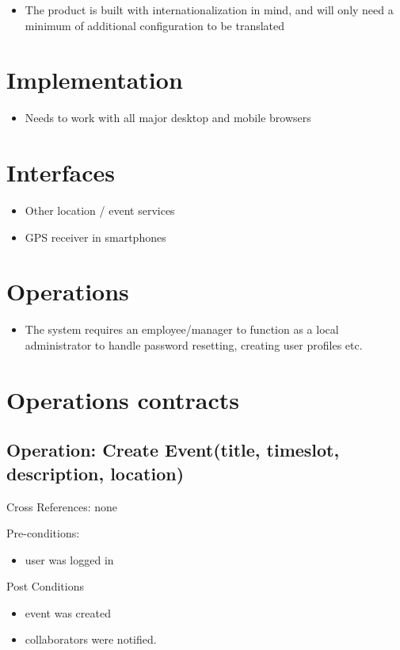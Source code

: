 \documentclass[10pt]{article}
\begin{document}
\begin{itemize}
\item The product is built with internationalization in mind, and will only need a minimum of additional configuration to be translated
\end{itemize}


\section{Implementation}
\begin{itemize}
\item Needs to work with all major desktop and mobile browsers
\end{itemize}

\section{Interfaces}

\begin{itemize}
\item Other location / event services
\item GPS receiver in smartphones
\end{itemize}

\section{Operations}
\begin{itemize}
\item The system requires an employee/manager to function as a local administrator to handle password resetting, creating user profiles etc.
\end{itemize}

\section{Operations contracts}
\subsection{Operation: Create Event(title, timeslot, description, location)}

Cross References: none

Pre-conditions:
\begin{itemize}
\item user was logged in
\end{itemize}

Post Conditions
\begin{itemize}
\item event was created
\item collaborators were notified.
\end{itemize}
\end{document}
